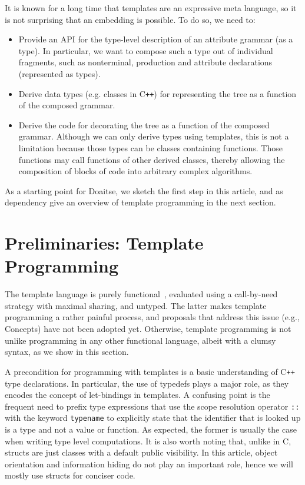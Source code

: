 \documentclass{llncs}
\newcommand*{\Cpp}{C\texttt{++}}
\begin{document}
  It is known for a long time that templates are
  an expressive meta language, so it is not surprising that an
  embedding is possible. To do so, we need to:
  \begin{itemize}
  \item Provide an API for the type-level description of an
    attribute grammar (as a type). In particular, we want to
    compose such a type out of individual fragments, such as
    nonterminal, production and attribute declarations (represented
    as types).
  \item Derive data types (e.g. classes in \Cpp) for representing
    the tree as a function of the composed grammar.
  \item Derive the code for decorating the tree as a function of
    the composed grammar. Although we can only derive types using
    templates, this is not a limitation because those types can
    be classes containing functions. Those functions may call
    functions of other derived classes, thereby allowing the
    composition of blocks of code into arbitrary complex
    algorithms.
  \end{itemize}
  As a starting point for Doaitse, we sketch the first step in this article,
  and as dependency give an overview of template programming in the
  next section.

\section{Preliminaries: Template Programming}
\label{sect:templates}

  The template language is purely functional~\cite{DBLP:dblp_journals/entcs/Sinkovics11},
  evaluated using a call-by-need strategy with maximal sharing, and untyped.
  The latter makes template programming a rather painful process,
  and proposals that address this issue (e.g., Concepts) have not been adopted yet.
  Otherwise, template programming is not unlike programming in any other
  functional language, albeit with a clumsy syntax, as we show
  in this section.

  A precondition for programming with templates is a basic understanding of \Cpp{} type
  declarations.
  In particular, the use of typedefs plays a
  major role, as they encodes the concept of let-bindings in templates.
  A confusing point is the frequent need to prefix type expressions that use
  the scope resolution operator \lstinline$::$ with the keyword
  \lstinline$typename$ to explicitly state that the identifier that
  is looked up is a type and not a value or function. As expected, the
  former is usually the case when writing type level computations.
  It is also worth noting that, unlike in C, structs are just
  classes with a default public visibility. In this article, object
  orientation and information hiding do not play an important role, hence
  we will mostly use structs for conciser code.
\end{document}

